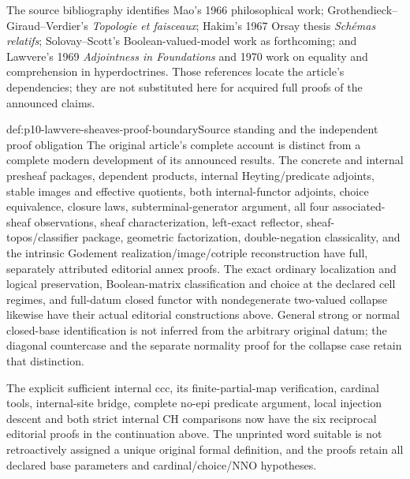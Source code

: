 The source bibliography identifies Mao's 1966 philosophical work;
Grothendieck--Giraud--Verdier's \emph{Topologie et faisceaux}; Hakim's
1967 Orsay thesis \emph{Sch\'emas relatifs}; Solovay--Scott's
Boolean-valued-model work as forthcoming; and Lawvere's 1969
\emph{Adjointness in Foundations} and 1970 work on equality and
comprehension in hyperdoctrines.  Those references locate the
article's dependencies; they are not substituted here for acquired
full proofs of the announced claims.

\begin{proofboundary}{def:p10-lawvere-sheaves-proof-boundary}{Source standing and the independent proof obligation}
The original article's complete account is distinct from a complete
modern development of its announced results.  The concrete and
internal presheaf packages, dependent products, internal
Heyting/predicate adjoints, stable images and effective quotients,
both internal-functor adjoints, choice equivalence, closure laws,
subterminal-generator argument, all four associated-sheaf
observations, sheaf characterization, left-exact reflector,
sheaf-topos/classifier package, geometric factorization,
double-negation classicality, and the intrinsic Godement
realization/image/cotriple reconstruction have
full, separately attributed editorial annex proofs. The exact ordinary
localization and logical preservation, Boolean-matrix classification
and choice at the declared cell regimes, and full-datum closed functor
with nondegenerate two-valued collapse likewise have their actual
editorial constructions above. General strong or normal closed-base
identification is not inferred from the arbitrary original datum;
the diagonal countercase and the separate normality proof for the
collapse case retain that distinction.

The explicit sufficient internal ccc, its finite-partial-map verification,
cardinal tools, internal-site bridge, complete no-epi predicate argument,
local injection descent and both strict internal CH comparisons now have
the six reciprocal editorial proofs in the continuation above. The
unprinted word suitable is not retroactively assigned a unique original
formal definition, and the proofs retain all declared base parameters
and cardinal/choice/NNO hypotheses.


\end{proofboundary}
